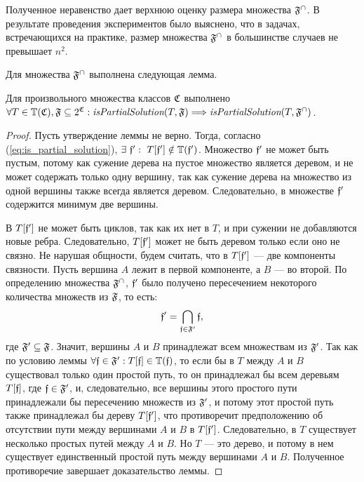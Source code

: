 Полученное неравенство дает верхнюю оценку размера множества $\mathfrak{F}^{\cap}$. В результате проведения экспериментов было выяснено, что в задачах, встречающихся на практике, размер множества $\mathfrak{F}^{\cap}$ в большинстве случаев не превышает $n^2$.

Для множества $\mathfrak{F}^{\cap}$ выполнена следующая лемма.

\vspace{1cm}
\begin{lemma}\label{lemma:f_closure_tree}
Для произвольного множества классов $\mathfrak{C}$ выполнено $\forall T \in \mathbb{T}(\mathfrak{C}), \mathfrak{F} \subseteq 2^{\mathfrak{C}}: \textit{isPartialSolution}(T, \mathfrak{F}) \Longrightarrow \textit{isPartialSolution}(T, \mathfrak{F}^{\cap})$.
\end{lemma}
\begin{proof}
Пусть утверждение леммы не верно. Тогда, согласно (\ref{eq:is_partial_solution}), $\exists~\mathfrak{f}':~T[\mathfrak{f}'] \notin \mathbb{T}(\mathfrak{f}')$. Множество $\mathfrak{f}'$ не может быть пустым, потому как сужение дерева на пустое множество является деревом, и не может содержать только одну вершину, так как сужение дерева на множество из одной вершины также всегда является деревом. Следовательно, в множестве $\mathfrak{f}'$ содержится минимум две вершины.

В $T[\mathfrak{f}']$ не может быть циклов, так как их нет в $T$, и при сужении не добавляются новые ребра. Следовательно, $T[\mathfrak{f}']$ может не быть деревом только если оно не связно. Не нарушая общности, будем считать, что в $T[\mathfrak{f}']$ --- две компоненты связности. Пусть вершина $A$ лежит в первой компоненте, а $B$ --- во второй. По определению множества $\mathfrak{F}^{\cap}$, $\mathfrak{f}'$ было получено пересечением некоторого количества множеств из $\mathfrak{F}$, то есть:
\begin{equation}
\mathfrak{f}' = \bigcap_{\mathfrak{f} \in \mathfrak{F}'} \mathfrak{f} \text{,}
\end{equation}
где $\mathfrak{F}' \subseteq \mathfrak{F}$. Значит, вершины $A$ и $B$ принадлежат всем множествам из $\mathfrak{F}'$. Так как по условию леммы $\forall \mathfrak{f} \in \mathfrak{F}': T[\mathfrak{f}] \in \mathbb{T}(\mathfrak{f})$, то если бы в $T$ между $A$ и $B$ существовал только один простой путь, то он принадлежал бы всем деревьям $T[\mathfrak{f}]$, где $\mathfrak{f} \in \mathfrak{F}'$, и, следовательно, все вершины этого простого пути принадлежали бы пересечению множеств из $\mathfrak{F}'$, и потому этот простой путь также принадлежал бы дереву $T[\mathfrak{f}']$, что противоречит предположению об отсутствии пути между вершинами $A$ и $B$ в $T[\mathfrak{f}']$. Следовательно, в $T$ существует несколько простых путей между $A$ и $B$. Но $T$ --- это дерево, и потому в нем существует единственный простой путь между вершинами $A$ и $B$. Полученное противоречие завершает доказательство леммы.
\end{proof}
\vspace{1cm}



